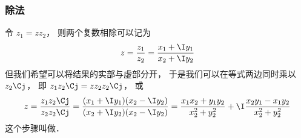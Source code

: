 \subsubsection{除法}
令 $z_1 = z z_2$， 则两个复数相除可以记为
\begin{equation}
z = \frac{z_1}{z_2} = \frac{x_1 + \I y_1}{x_2 + \I y_2}
\end{equation}
但我们希望可以将结果的实部与虚部分开， 于是我们可以在等式两边同时乘以 $z_2\Cj$， 即 $z_1 z_2\Cj  = z z_2 z_2\Cj$， 或
\begin{equation}
z = \frac{z_1 z_2\Cj}{z_2 z_2\Cj}
= \frac{(x_1 + \I y_1)(x_2 - \I y_2)}{(x_2 + \I y_2)(x_2 - \I y_2)}
= \frac{x_1 x_2 + y_1 y_2}{x_2^2 + y_2^2} + \I \frac{x_2 y_1 - x_1 y_2}{x_2^2 + y_2^2}
\end{equation}
这个步骤叫做．
